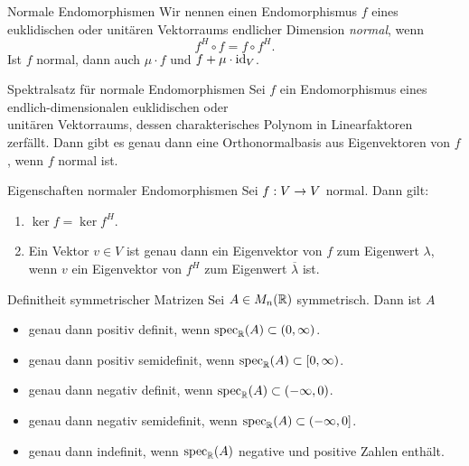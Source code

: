 \documentclass[main.tex]{subfiles}
\begin{document}
\begin{karte}{Normale Endomorphismen}
    Wir nennen einen Endomorphismus 
    \( f \) eines euklidischen oder unitären 
    Vektorraums endlicher Dimension \textit{normal}, 
    wenn 
    \[ f^H \circ f = f \circ f^H. \]
    Ist \( f \) normal, dann auch \( \mu \cdot f \) 
    und \( f + \mu \cdot \operatorname{id}_V \). 
\end{karte}

\begin{karte}{Spektralsatz für normale Endomorphismen}
    Sei \( f \) ein Endomorphismus eines endlich-dimensionalen 
    euklidischen oder \\
    unitären Vektorraums, dessen 
    charakterisches Polynom in Linearfaktoren \\
    zerfällt. 
    Dann gibt es genau dann eine Orthonormalbasis aus 
    Eigenvektoren von \(f\), wenn \(f\) normal ist.
\end{karte}

\begin{karte}{Eigenschaften normaler Endomorphismen}
    Sei \(f : V \rightarrow V\) normal. Dann gilt: 
    \begin{enumerate}
        \item \( \ker f = \ker f^H \).
        \item Ein Vektor \(v\in V\) ist genau dann ein 
        Eigenvektor von \(f\) zum Eigenwert \(\lambda\), 
        wenn \(v\) ein Eigenvektor von \( f^H \) zum 
        Eigenwert \( \overline{\lambda} \) ist.
    \end{enumerate}
\end{karte}

\begin{karte}{Definitheit symmetrischer Matrizen}
    Sei \( A\in M_n(\mathbb{R}) \) symmetrisch. Dann ist \(A\)
    \begin{itemize}
        \item genau dann positiv definit, 
        wenn \( \operatorname{spec}_{\mathbb{R}}(A) \subset (0,\infty) \).
        \item genau dann positiv semidefinit, 
        wenn \( \operatorname{spec}_{\mathbb{R}}(A) \subset [0,\infty) \).
        \item genau dann negativ definit, 
        wenn \( \operatorname{spec}_{\mathbb{R}}(A) \subset (-\infty, 0) \).
        \item genau dann negativ semidefinit, 
        wenn \( \operatorname{spec}_{\mathbb{R}}(A) \subset (-\infty, 0] \).
        \item genau dann indefinit, wenn 
        \( \operatorname{spec}_{\mathbb{R}}(A) \) negative und positive Zahlen 
        enthält.
    \end{itemize}
\end{karte}
\end{document}
